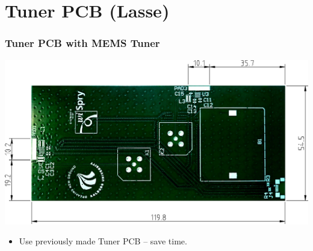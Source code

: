 \section[Tuner PCB]{Tuner PCB (Lasse)}
\begin{frame}[fragile]
    \frametitle{Tuner PCB with MEMS Tuner}
\begin{center}
            \includegraphics[scale=0.5]{img/Lasse/samanthas_board.pdf}
\end{center}
\begin{itemize}
\item Use previously made Tuner PCB -- save time.
\end{itemize}
\end{frame}

